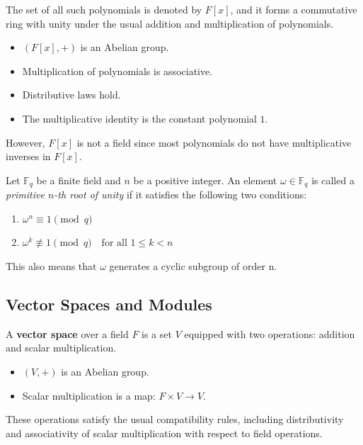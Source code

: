 The set of all such polynomials is denoted by $F[x]$, and it forms a commutative ring with unity under the usual addition and multiplication of polynomials.
\begin{itemize}
    \item $(F[x], +)$ is an Abelian group.
    \item Multiplication of polynomials is associative.
    \item Distributive laws hold.
    \item The multiplicative identity is the constant polynomial $1$.
\end{itemize}

However, $F[x]$ is not a field since most polynomials do not have multiplicative inverses in $F[x]$.


\begin{definition}
    Let $\mathbb{F}_q$ be a finite field and $n$ be a positive integer. An element $\omega \in \mathbb{F}_q$ is called a \textit{primitive $n$-th root of unity} if it satisfies the following two conditions:
\begin{enumerate}
    \item $\omega^n \equiv 1 \pmod q$
    \item $\omega^k \not\equiv 1 \pmod q \quad \text{for all } 1 \le k < n$
\end{enumerate}
This also means that $\omega$ generates a cyclic subgroup of order n.
\end{definition}


\subsection{Vector Spaces and Modules}

\begin{definition}
A \textbf{vector space} over a field $F$ is a set $V$ equipped with two operations: addition and scalar multiplication.

\begin{itemize}
    \item $(V,+)$ is an Abelian group.
    \item Scalar multiplication is a map: $F \times V \to V$.
\end{itemize}

These operations satisfy the usual compatibility rules, including distributivity and associativity of scalar multiplication with respect to field operations.
\end{definition}

